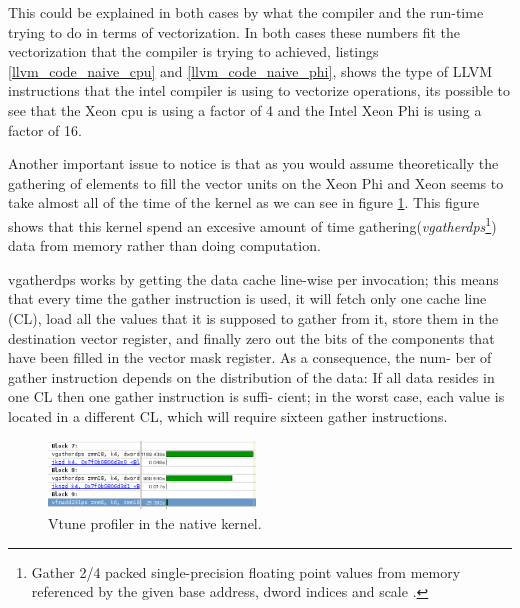 \par{This could be explained in both cases by what the compiler and the run-time trying to do in terms of vectorization. In both 
cases these numbers fit the vectorization that the compiler is trying to achieved, listings 
\ref{llvm_code_naive_cpu} and \ref{llvm_code_naive_phi}, shows the type of LLVM instructions that the intel compiler is using to 
vectorize operations, its possible to see that the Xeon cpu is using a factor of 4 and the Intel Xeon Phi is using a factor of 16.}





\par{Another important issue to notice is that as you would assume theoretically the gathering of elements to fill the vector 
    units on the Xeon Phi and Xeon seems to take almost all of the time of the kernel as we can see in figure \ref{vtune_naive}. This 
    figure shows that this kernel spend an excesive amount of time gathering(\emph{vgatherdps}\footnote{Gather 2/4 packed 
    single-precision floating point values from memory referenced by the given base address, dword indices and scale 
    \cite{intrinsics}.}) data from memory rather than doing computation.}

\par{vgatherdps works by getting the data cache line-wise per invocation; this means that every time the gather instruction 
    is used, it will fetch only one cache line (CL), load all the values that it is supposed to gather from it, store them in 
    the destination vector register, and finally zero out the bits of the components that have been filled in the vector mask 
    register. As a consequence, the num- ber of gather instruction depends on the distribution of the data: 
    If all data resides in one CL then one gather instruction is suffi- cient; 
    in the worst case, each value is located in a different CL, which will require sixteen gather instructions\cite{simd}.}

\begin{figure}[!h]
    \centering
    \includegraphics[width=0.49\textwidth]{figures/vtune_naive.png}
    \caption{Vtune profiler in the native kernel.}
    \label{vtune_naive}
\end{figure}


